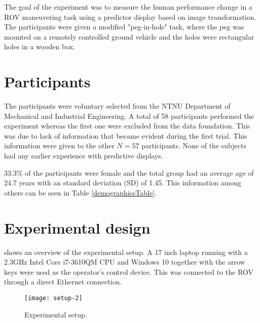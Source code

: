 The goal of the experiment was to measure the human performance change in a ROV maneuvering task using a predictor display based on image transformation. The participants were given a modified "peg-in-hole" task, where the peg was mounted on a remotely controlled ground vehicle and the holes were rectangular holes in a wooden box.


\section{Participants}

The participants were voluntary selected from the NTNU Department of Mechanical and Industrial Engineering. A total of 58 participants performed the experiment whereas the first one were excluded from the data foundation. This was due to lack of information that became evident during the first trial. This information were given to the other $N=57$ participants. None of the subjects had any earlier experience with predictive displays.

33.3\% of the participants were female and the total group had an average age of 24.7 years with an standard deviation (SD) of 1.45. This information among others can be seen in Table \ref{demographicsTable}.

\clearpage
\section{Experimental design}

 shows an overview of the experimental setup. A 17 inch laptop running with a 2.3GHz Intel Core i7-3610QM CPU and Windows 10 together with the arrow keys were used as the operator's control device. This was connected to the ROV through a direct Ethernet connection. 

\begin{figure}[h!]
    \centering
    \texttt{[image: setup-2]}
    \caption{Experimental setup.}
    \label{expsetup}
\end{figure}

